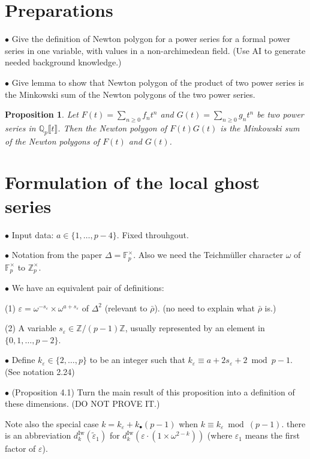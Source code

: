\documentclass[12pt]{amsart}
\newtheorem{proposition}[subsection]{Proposition}
\theoremstyle{definition}
\numberwithin{equation}{subsection}
\def\FF{\mathbb{F}}
\def\QQ{\mathbb{Q}}
\def\ZZ{\mathbb{Z}}
\newcommand{\Iw}{\mathrm{Iw}}
\begin{document}
\section{Preparations}

$\bullet$ Give the definition of Newton polygon for a power series for a formal power series in one variable, with values in a non-archimedean field. (Use AI to generate needed background knowledge.)

$\bullet$ Give lemma to show that Newton polygon of the product of two power series is the Minkowski sum of the Newton polygons of the two power series.

\begin{proposition}
    Let $F(t) = \sum_{n \geq 0} f_n t^n$ and $G(t) = \sum_{n \geq 0} g_n t^n$ be two power series in $\QQ_p\llbracket t\rrbracket$. Then the Newton polygon of $F(t)G(t)$ is the Minkowski sum of the Newton polygons of $F(t)$ and $G(t)$.
\end{proposition}

\section{Formulation of the local ghost series}

$\bullet$ Input data: $a \in \{1, \dots, p-4\}$. Fixed throuhgout.

$\bullet$ Notation from the paper $\Delta = \FF_p^\times$. Also we need the Teichmüller character $\omega$ of $\FF_p^\times$ to $\ZZ_p^\times$.

$\bullet$ We have an equivalent pair of definitions:

(1) $\varepsilon = \omega^{-s_\varepsilon} \times \omega^{a+s_\varepsilon}$ of $\Delta^2$ (relevant to $\bar \rho$). (no need to explain what $\bar \rho$ is.)

(2) A variable $s_\varepsilon \in \ZZ/(p-1)\ZZ$, usually represented by an element in $\{0, 1, \dots, p-2\}$.


$\bullet$ Define $k_\varepsilon \in \{2, \dots, p\}$ to be an integer such that $k_\varepsilon \equiv a+2s_\varepsilon+2 \bmod{p-1}$. (See notation 2.24)

$\bullet$ (Proposition 4.1) Turn the main result of this proposition into a definition of these dimensions.  (DO NOT PROVE IT.)

Note also the special case $k = k_\varepsilon + k_\bullet (p-1)$ when $k \equiv k_\varepsilon \bmod{(p-1)}$. there is an abbreviation $d_k^\Iw(\tilde \varepsilon_1)$ for $d_k^\Iw(\varepsilon\cdot (1\times \omega^{2-k}))$ (where $\varepsilon_1$ means the first factor of $\varepsilon$).
\end{document}
